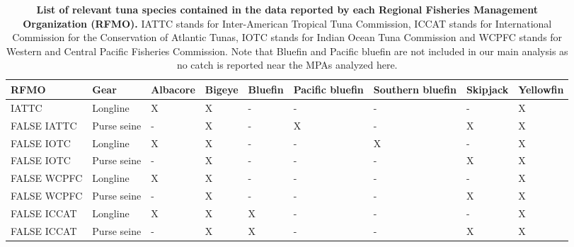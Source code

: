 \begin{table}

\caption{\label{tab:rfmo_spp}\textbf{List of relevant tuna species contained in the data reported
      by each Regional Fisheries Management Organization (RFMO).} IATTC stands for Inter-American Tropical Tuna Commission,
      ICCAT stands for International Commission for the Conservation of Atlantic Tunas, IOTC stands for Indian Ocean Tuna
      Commission and WCPFC stands for Western and Central Pacific Fisheries Commission.
      Note that Bluefin and Pacific bluefin are not included in our main analysis as no catch is reported near the MPAs analyzed here.}
\centering
\begin{tabular}[t]{lllllllll}
\toprule
RFMO & Gear & Albacore & Bigeye & Bluefin & Pacific bluefin & Southern bluefin & Skipjack & Yellowfin\\
\midrule
IATTC & Longline & X & X & - & - & - & - & X\\
FALSE
IATTC & Purse seine & - & X & - & X & - & X & X\\
FALSE
IOTC & Longline & X & X & - & - & X & - & X\\
FALSE
IOTC & Purse seine & - & X & - & - & - & X & X\\
FALSE
WCPFC & Longline & X & X & - & - & - & - & X\\
FALSE
WCPFC & Purse seine & - & X & - & - & - & X & X\\
FALSE
ICCAT & Longline & X & X & X & - & - & - & X\\
FALSE
ICCAT & Purse seine & - & X & X & - & - & X & X\\
\bottomrule
\end{tabular}
\end{table}